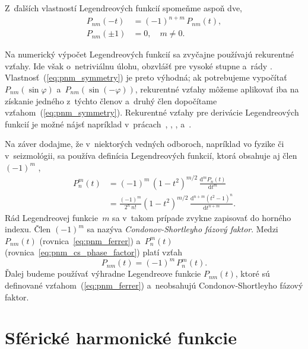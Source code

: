 \documentclass[a4paper, 12pt]{book}
\newcommand{\diff}{\mathrm d}
\begin{document}
Z~ďalších vlastností Legendreových funkcií spomeňme aspoň dve,
%
\begin{align}
\label{eq:pnm_symmetry}
P_{nm}(-t) &= (-1)^{n + m} \, P_{nm}(t){,}\\
%
P_{nm}(\pm1) &= 0{,} \quad m \neq 0{.}
\end{align}

Na numerický výpočet Legendreových funkcií sa zvyčajne používajú rekurentné 
vzťahy.  Ide však o~netriviálnu úlohu, obzvlášť pre vysoké stupne a~rády 
\parencite{Holmes2002a,Fukushima2012a,Ishioka2018}.  
Vlastnosť~(\ref{eq:pnm_symmetry}) je preto výhodná; ak potrebujeme vypočítať 
$P_{nm}(\sin\varphi)$ a~$P_{nm}(\sin(-\varphi))$, rekurentné vzťahy môžeme 
aplikovať iba na získanie jedného z~týchto členov a~druhý člen dopočítame 
vzťahom~(\ref{eq:pnm_symmetry}).  Rekurentné vzťahy pre derivácie Legendreových 
funkcií je možné nájsť napríklad v~prácach~\textcite{Tscherning1976b}, 
\textcite{Bosch2000}, \textcite{Holmes2002a}, \textcite{Freeden2009} 
a~\textcite{Fukushima2012b}.

Na záver dodajme, že v~niektorých vedných odboroch, napríklad vo fyzike či 
v~seizmológii, sa používa definícia Legendreových funkcií, ktorá obsahuje aj 
člen~$(-1)^m$ \parencite{Wieczorek2015,Olver2010},
%
\begin{equation}
\label{eq:pnm_cs_phase_factor}
\begin{split}
P_n^m(t) &= (-1)^m \, (1 - t^2)^{m \slash 2} \, \frac{\diff^m P_n(t)}{\diff 
t^m}\\
%
&= \frac{(-1)^m}{2^n \, n!} (1 - t^2)^{ m \slash 2} \, \frac{\diff^{n + m}
(t^2 - 1)^n}{\diff t^{n + m}}{.}
\end{split}
\end{equation}
%
Rád Legendreovej funkcie~$m$ sa v~takom prípade zvykne zapisovať do horného 
indexu.  Člen $(-1)^{m}$ sa nazýva \emph{Condonov-Shortleyho fázový faktor}.  
Medzi $P_{nm}(t)$ (rovnica~\ref{eq:pnm_ferrer}) a~$P_n^m(t)$ 
(rovnica~\ref{eq:pnm_cs_phase_factor}) platí vzťah
%
\begin{equation}
P_{nm}(t) = (-1)^m \, P_n^m(t){.}
\end{equation}
%
Ďalej budeme používať výhradne Legendreove funkcie $P_{nm}(t)$, ktoré sú 
definované vzťahom~(\ref{eq:pnm_ferrer}) a~neobsahujú Condonov-Shortleyho 
fázový faktor.




\section{Sférické harmonické funkcie}
\label{sec:spherical_harmonics}
\end{document}

